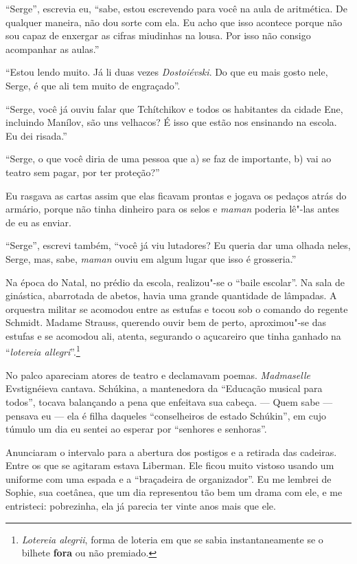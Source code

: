 ``Serge'', escrevia eu, ``sabe, estou escrevendo para você na aula de
aritmética. De qualquer maneira, não dou sorte com ela. Eu acho que isso
acontece porque não sou capaz de enxergar as cifras miudinhas na lousa.
Por isso não consigo acompanhar as aulas.''

``Estou lendo muito. Já li duas vezes \emph{Dostoiévski}. Do que eu mais
gosto nele, Serge, é que ali tem muito de engraçado''.

``Serge, você já ouviu falar que Tchítchikov e todos os habitantes da
cidade Ene, incluindo Manílov, são uns velhacos? É isso que estão nos
ensinando na escola. Eu dei risada.''

``Serge, o que você diria de uma pessoa que a) se faz de importante, b)
vai ao teatro sem pagar, por ter proteção?''

Eu rasgava as cartas assim que elas ficavam prontas e jogava os pedaços
atrás do armário, porque não tinha dinheiro para os selos e \emph{maman}
poderia lê"-las antes de eu as enviar.

``Serge'', escrevi também, ``você já viu lutadores? Eu queria dar uma
olhada neles, Serge, mas, sabe, \emph{maman} ouviu em algum lugar que
isso é grosseria.''

Na época do Natal, no prédio da escola, realizou"-se o ``baile escolar''.
Na sala de ginástica, abarrotada de abetos, havia uma grande quantidade
de lâmpadas. A orquestra militar se acomodou entre as estufas e tocou
sob o comando do regente Schmidt. Madame Strauss, querendo ouvir bem de
perto, aproximou"-se das estufas e se acomodou ali, atenta, segurando o
açucareiro que tinha ganhado na ``\emph{lotereia allegri}''.\footnote{\emph{Lotereia
  alegrii}, forma de loteria em que se sabia instantaneamente se o
  bilhete \textbf{fora} ou não premiado.}

No palco apareciam atores de teatro e declamavam poemas.
\emph{Madmaselle} Evstignéieva cantava. Schúkina, a mantenedora da
``Educação musical para todos'', tocava balançando a pena que enfeitava
sua cabeça. --- Quem sabe --- pensava eu --- ela é filha daqueles
``conselheiros de estado Schúkin'', em cujo túmulo um dia eu sentei ao
esperar por ``senhores e senhoras''.

Anunciaram o intervalo para a abertura dos postigos e a retirada das
cadeiras. Entre os que se agitaram estava Liberman. Ele ficou muito
vistoso usando um uniforme com uma espada e a ``braçadeira de
organizador''. Eu me lembrei de Sophie, sua coetânea, que um dia
representou tão bem um drama com ele, e me entristeci: pobrezinha, ela
já parecia ter vinte anos mais que ele.

